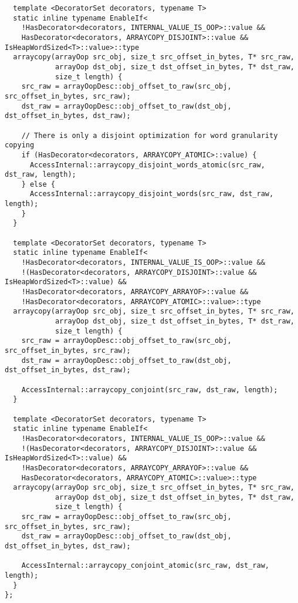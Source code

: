 \begin{itemize}
\begin{verbatim}
  template <DecoratorSet decorators, typename T>
  static inline typename EnableIf<
    !HasDecorator<decorators, INTERNAL_VALUE_IS_OOP>::value &&
    HasDecorator<decorators, ARRAYCOPY_DISJOINT>::value && IsHeapWordSized<T>::value>::type
  arraycopy(arrayOop src_obj, size_t src_offset_in_bytes, T* src_raw,
            arrayOop dst_obj, size_t dst_offset_in_bytes, T* dst_raw,
            size_t length) {
    src_raw = arrayOopDesc::obj_offset_to_raw(src_obj, src_offset_in_bytes, src_raw);
    dst_raw = arrayOopDesc::obj_offset_to_raw(dst_obj, dst_offset_in_bytes, dst_raw);

    // There is only a disjoint optimization for word granularity copying
    if (HasDecorator<decorators, ARRAYCOPY_ATOMIC>::value) {
      AccessInternal::arraycopy_disjoint_words_atomic(src_raw, dst_raw, length);
    } else {
      AccessInternal::arraycopy_disjoint_words(src_raw, dst_raw, length);
    }
  }

  template <DecoratorSet decorators, typename T>
  static inline typename EnableIf<
    !HasDecorator<decorators, INTERNAL_VALUE_IS_OOP>::value &&
    !(HasDecorator<decorators, ARRAYCOPY_DISJOINT>::value && IsHeapWordSized<T>::value) &&
    !HasDecorator<decorators, ARRAYCOPY_ARRAYOF>::value &&
    !HasDecorator<decorators, ARRAYCOPY_ATOMIC>::value>::type
  arraycopy(arrayOop src_obj, size_t src_offset_in_bytes, T* src_raw,
            arrayOop dst_obj, size_t dst_offset_in_bytes, T* dst_raw,
            size_t length) {
    src_raw = arrayOopDesc::obj_offset_to_raw(src_obj, src_offset_in_bytes, src_raw);
    dst_raw = arrayOopDesc::obj_offset_to_raw(dst_obj, dst_offset_in_bytes, dst_raw);

    AccessInternal::arraycopy_conjoint(src_raw, dst_raw, length);
  }

  template <DecoratorSet decorators, typename T>
  static inline typename EnableIf<
    !HasDecorator<decorators, INTERNAL_VALUE_IS_OOP>::value &&
    !(HasDecorator<decorators, ARRAYCOPY_DISJOINT>::value && IsHeapWordSized<T>::value) &&
    !HasDecorator<decorators, ARRAYCOPY_ARRAYOF>::value &&
    HasDecorator<decorators, ARRAYCOPY_ATOMIC>::value>::type
  arraycopy(arrayOop src_obj, size_t src_offset_in_bytes, T* src_raw,
            arrayOop dst_obj, size_t dst_offset_in_bytes, T* dst_raw,
            size_t length) {
    src_raw = arrayOopDesc::obj_offset_to_raw(src_obj, src_offset_in_bytes, src_raw);
    dst_raw = arrayOopDesc::obj_offset_to_raw(dst_obj, dst_offset_in_bytes, dst_raw);

    AccessInternal::arraycopy_conjoint_atomic(src_raw, dst_raw, length);
  }
};
\end{verbatim}


\end{itemize}
